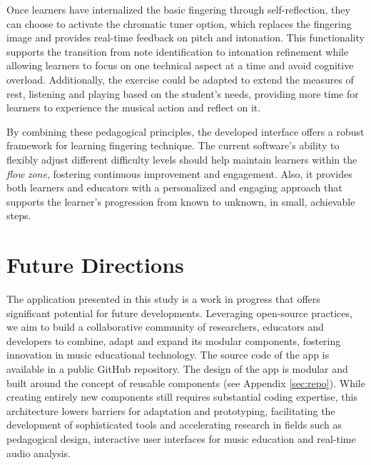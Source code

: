 \documentclass[runningheads]{llncs}
\begin{document}
Once learners have internalized the basic fingering through self-reflection, they can choose to activate the chromatic tuner option, which replaces the fingering image and provides real-time feedback on pitch and intonation. This functionality supports the transition from note identification to intonation refinement while allowing learners to focus on one technical aspect at a time and avoid cognitive overload. Additionally, the exercise could be adapted to extend the measures of rest, listening and playing based on the student's needs, providing more time for learners to experience the musical action and reflect on it.

By combining these pedagogical principles, the developed interface offers a robust framework for learning fingering technique. The current software's ability to flexibly adjust different difficulty levels should help maintain learners within the \textit{flow zone}, fostering continuous improvement and engagement. Also, it provides both learners and educators with a personalized and engaging approach that supports the learner's progression from known to unknown, in small, achievable steps.


\section{Future Directions}
\label{sec:Suggestions_for_future_studies}

The application presented in this study is a work in progress that offers significant potential for future developments. Leveraging open-source practices, we aim to build a collaborative community of researchers, educators and developers to combine, adapt and expand its modular components, fostering innovation in music educational technology. The source code of the app is available in a public GitHub repository. The design of the app is modular and built around the concept of reusable components (see Appendix \ref{sec:repo}). While creating entirely new components still requires substantial coding expertise, this architecture lowers barriers for adaptation and prototyping, facilitating the development of sophisticated tools and accelerating research in fields such as pedagogical design, interactive user interfaces for music education and real-time audio analysis.
\end{document}
